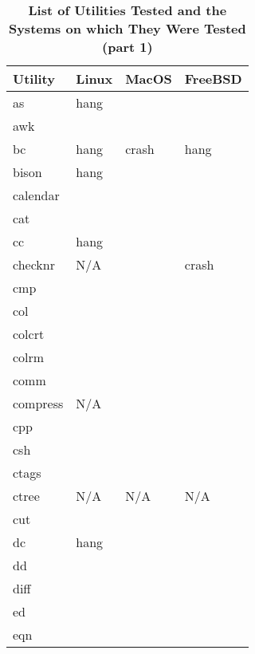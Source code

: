 
\begin{table}[htbp]  %
\renewcommand\thetable{1}
\centering  %
 \begin{tabular}{|p{2.5cm}|p{2cm}|p{2cm}|p{2cm}|}  
     \hline
     \hline
        Utility & Linux & MacOS & FreeBSD \\ %
       \hline
       as & hang  &   &    \\
       awk &   &   &    \\
       bc & hang  & crash  & hang   \\
       bison & hang  &   &    \\
       calendar &   &   &    \\
       cat &   &   &    \\
       cc & hang  &   &    \\
       checknr & N/A  &   &  crash  \\
       cmp &   &   &    \\
       col &   &   &    \\
       colcrt &   &   &    \\
       colrm &   &   &    \\
       comm &   &   &    \\
       compress & N/A  &   &    \\
       cpp &   &   &    \\
       csh &   &   &    \\
       ctags &   &   &    \\
       ctree & N/A  & N/A  & N/A   \\
       cut &   &   &   \\
       dc & hang  &   &    \\
       dd &   &   &    \\
       diff &   &   &    \\
       ed &   &   &    \\
       eqn &   &   &    \\
       \hline
       \hline
   \end{tabular}
   \caption{\textbf{List of Utilities Tested and the Systems on which They Were Tested (part 1)}}  %
\end{table}

